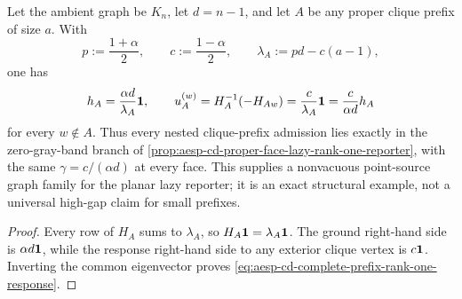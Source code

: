 \begin{corollary}
\label{cor:aesp-cd-complete-prefix-rank-one-reporter}
Let the ambient graph be \(K_n\), let \(d=n-1\), and let \(A\) be any proper
clique prefix of size \(a\).  With
\begin{equation*}
 p:=\frac{1+\alpha}{2},
 \qquad
 c:=\frac{1-\alpha}{2},
 \qquad
 \lambda_A:=pd-c(a-1),
\end{equation*}
one has
\begin{equation}
 h_A=\frac{\alpha d}{\lambda_A}\mathbf{1},
 \qquad
 u_A^{(w)}=H_A^{-1}(-H_{Aw})
          =\frac{c}{\lambda_A}\mathbf{1}
          =\frac{c}{\alpha d}h_A
 \label{eq:aesp-cd-complete-prefix-rank-one-response}
\end{equation}
for every \(w\notin A\).  Thus every nested clique-prefix admission lies
exactly in the zero-gray-band branch of
\cref{prop:aesp-cd-proper-face-lazy-rank-one-reporter}, with the same
\(\gamma=c/(\alpha d)\) at every face.  This supplies a nonvacuous
point-source graph family for the planar lazy reporter; it is an exact
structural example, not a universal high-gap claim for small prefixes.
\end{corollary}

\begin{proof}
Every row of \(H_A\) sums to
\(\lambda_A\), so
\(H_A\mathbf{1}=\lambda_A\mathbf{1}\).  The ground right-hand side is
\(\alpha d\mathbf{1}\), while the response right-hand side to any exterior clique
vertex is \(c\mathbf{1}\).  Inverting the common eigenvector proves
\cref{eq:aesp-cd-complete-prefix-rank-one-response}.
\end{proof}


